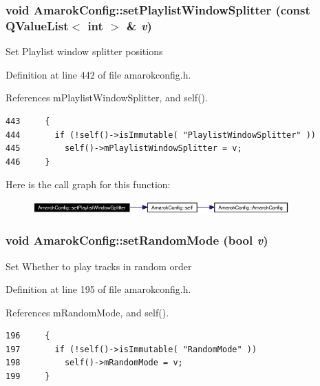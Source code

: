 \subsubsection{\setlength{\rightskip}{0pt plus 5cm}void Amarok\-Config::set\-Playlist\-Window\-Splitter (const QValue\-List$<$ int $>$ \& {\em v})\hspace{0.3cm}{\tt  [inline, static]}}\label{classAmarokConfig_AmarokConfige45}


Set Playlist window splitter positions 

Definition at line 442 of file amarokconfig.h.

References m\-Playlist\-Window\-Splitter, and self().



\footnotesize\begin{verbatim}443     {
444       if (!self()->isImmutable( "PlaylistWindowSplitter" ))
445         self()->mPlaylistWindowSplitter = v;
446     }
\end{verbatim}\normalsize 


Here is the call graph for this function:\begin{figure}[H]
\begin{center}
\leavevmode
\includegraphics[width=279pt]{classAmarokConfig_AmarokConfige45_cgraph}
\end{center}
\end{figure}
\subsubsection{\setlength{\rightskip}{0pt plus 5cm}void Amarok\-Config::set\-Random\-Mode (bool {\em v})\hspace{0.3cm}{\tt  [inline, static]}}\label{classAmarokConfig_AmarokConfige19}


Set Whether to play tracks in random order 

Definition at line 195 of file amarokconfig.h.

References m\-Random\-Mode, and self().



\footnotesize\begin{verbatim}196     {
197       if (!self()->isImmutable( "RandomMode" ))
198         self()->mRandomMode = v;
199     }
\end{verbatim}\normalsize 


